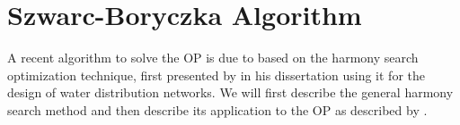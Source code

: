 \section{Szwarc-Boryczka Algorithm}
\label{sec:04:szwarc}

A recent algorithm to solve the OP is due to \citeauthor{szwarc_novel_2022} \cite{szwarc_novel_2022} based on the harmony search optimization technique, 
first presented by \citeauthor{geem_optimal_2000} in his dissertation using it for the design of water distribution networks. \cite{geem_optimal_2000}
We will first describe the general harmony search method and then describe its application to the OP as described by \citeauthor{szwarc_novel_2022}.


